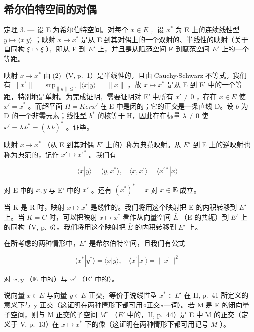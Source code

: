 \subsection{希尔伯特空间的对偶}

定理 3. --- 设 E 为希尔伯特空间。对每个 \(x \in E\) ，设 \(x^{*}\) 为 E 上的连续线性型 \(y \mapsto \langle x | y \rangle\) ；映射 \(x \mapsto x^{*}\) 是从 E 到其对偶上的一个双射的、半线性的映射（关于自同构 \(\xi \mapsto \overline{\xi}\) ），即从 E 到 \(E'\) 上，并且是从赋范空间 E 到赋范空间 \(E'\) 上的一个等距。

映射 \(x \mapsto x^*\) 由 (2)（V, p.~1）是半线性的，且由 Cauchy-Schwarz 不等式，我们有 \(\| x^* \| = \sup_{\| y \| \leqslant 1} |\langle x | y \rangle| = \| x \|\) ，故 \(x \mapsto x^*\) 是从 E 到 E' 中的一个等距，特别地是单射。为完成证明，需要证明对 E' 中所有 \(x' \neq 0\) ，存在 \(x \in E\) 使 \(x' = x^*\) 。而超平面 \(H = Ker x'\) 在 E 中是闭的；它的正交是一条直线 D。设 \(b\) 为 D 的一个非零元素；线性型 \(b^*\) 的核等于 H，因此存在标量 \(\lambda \neq 0\) 使 \(x' = \lambda . b^* = (\overline{\lambda}. b)^*\) 。证毕。

映射 \(x \mapsto x^{*}\) （从 E 到其对偶 \(E'\) 上的）称为典范映射。从 \(E'\) 到 E 上的逆映射也称为典范的，记作 \(x' \mapsto x'^{*}\) 。我们有

\[
\langle x | y \rangle = \langle y, x ^ {*} \rangle , \quad \langle x, x ^ {\prime} \rangle = \langle x ^ {\prime *} | x \rangle\tag{17}
\]

对 E 中的 \(x, y\) 与 E' 中的 \(x'\) 。还有 \((x^{*})^{*} = x\) 对 \(x \in \mathbf{E}\) 成立。

当 K 是 R 时，映射 \(x \mapsto x^{*}\) 是线性的。我们将用这个映射把 E 的内积转移到 \(E'\) 上。当 \(K = C\) 时，可以把映射 \(x \mapsto x^{*}\) 看作从向量空间 \(\overline{E}\) （E 的共轭）到 \(E'\) 上的同构（V, p.~6）。我们将用这个映射把 \(\overline{E}\) 的内积转移到 \(E'\) 上。

在所考虑的两种情形中，\(E'\) 是希尔伯特空间，且我们有公式

\[
\langle x ^ {*} | y ^ {*} \rangle = \overline {{\langle x | y \rangle}}, \quad \langle x ^ {\prime} | x ^ {\prime} \rangle = \| x ^ {\prime} \| ^ {2}
\]

对 \(x, y\) （\(\mathbf{E}\) 中的）与 \(x'\) （\(\mathbf{E}'\) 中的）。

说向量 \(x \in E\) 与向量 \(y \in E\) 正交，等价于说线性型 \(x^{*} \in E'\) 在 II, p.~41 所定义的意义下与 y 正交（这证明在两种情形下都可用«正交»一词）。若 M 是 E 的闭向量子空间，则与 M 正交的子空间 \(M^{\circ}\) （\(E'\) 中的，II, p.~44）是 E 中 M 的正交（定义于 V, p.~13）在 \(x \mapsto x^{*}\) 下的像（这证明在两种情形下都可用记号 \(M^{\circ}\)）。

